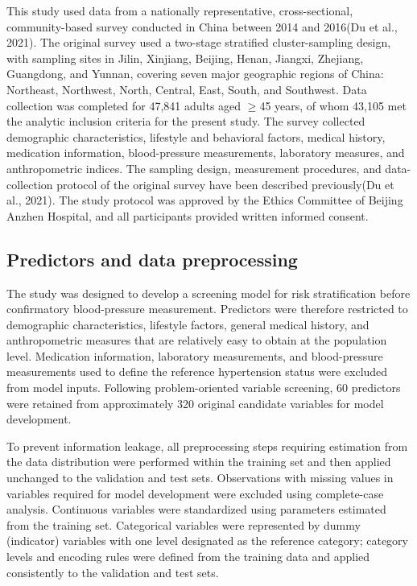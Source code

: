 \documentclass[10pt]{article}
\begin{document}
This study used data from a nationally representative, cross-sectional,
community-based survey conducted in China between 2014 and 2016(Du et
al., 2021). The original survey used a two-stage stratified
cluster-sampling design, with sampling sites in Jilin, Xinjiang,
Beijing, Henan, Jiangxi, Zhejiang, Guangdong, and Yunnan, covering seven
major geographic regions of China: Northeast, Northwest, North, Central,
East, South, and Southwest. Data collection was completed for 47,841
adults aged $\geq$45 years, of whom 43,105 met the analytic inclusion
criteria for the present study. The survey collected demographic
characteristics, lifestyle and behavioral factors, medical history,
medication information, blood-pressure measurements, laboratory
measures, and anthropometric indices. The sampling design, measurement
procedures, and data-collection protocol of the original survey have
been described previously(Du et al., 2021). The study protocol was
approved by the Ethics Committee of Beijing Anzhen Hospital, and all
participants provided written informed consent.

\subsection{Predictors and data
preprocessing}\label{predictors-and-data-preprocessing}

The study was designed to develop a screening model for risk
stratification before confirmatory blood-pressure measurement.
Predictors were therefore restricted to demographic characteristics,
lifestyle factors, general medical history, and anthropometric measures
that are relatively easy to obtain at the population level. Medication
information, laboratory measurements, and blood-pressure measurements
used to define the reference hypertension status were excluded from
model inputs. Following problem-oriented variable screening, 60
predictors were retained from approximately 320 original candidate
variables for model development.

To prevent information leakage, all preprocessing steps requiring
estimation from the data distribution were performed within the training
set and then applied unchanged to the validation and test sets.
Observations with missing values in variables required for model
development were excluded using complete-case analysis. Continuous
variables were standardized using parameters estimated from the training
set. Categorical variables were represented by dummy (indicator)
variables with one level designated as the reference category; category
levels and encoding rules were defined from the training data and
applied consistently to the validation and test sets.
\end{document}
